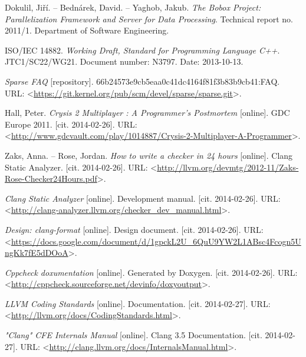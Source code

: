 
\def\bibname{Bibliography}
\begin{thebibliography}{99}
\addcontentsline{toc}{chapter}{\bibname}


	{\sc Dokulil}, Jiří. -- {\sc Bednárek}, David. -- {\sc Yaghob}, Jakub.
	\emph{The Bobox Project: Parallelization Framework and Server for Data Processing}.
	Technical report no. 2011/1.
	Department of Software Engineering.
	
	ISO/IEC 14882.
	\emph{Working Draft, Standard for Programming Language C++}.
	JTC1/SC22/WG21.
	Document number: N3797.
	Date: 2013-10-13.
	
	\emph{Sparse FAQ} [repository].
	66b24573e9cb5eaa0c41dc4164f81f3b83b9cb41:FAQ.
	URL: <\url{https://git.kernel.org/pub/scm/devel/sparse/sparse.git}>.
	
	{\sc Hall}, Peter.
	\emph{Crysis 2 Multiplayer : A Programmer's Postmortem} [online].
	GDC Europe 2011.
	[cit. 2014-02-26].
	URL: <\url{http://www.gdcvault.com/play/1014887/Crysis-2-Multiplayer-A-Programmer}>.
	
	{\sc Zaks}, Anna. -- {\sc Rose}, Jordan.
	\emph{How to write a checker in 24 hours} [online].
	Clang Static Analyzer.
	[cit. 2014-02-26].
	URL: <\url{http://llvm.org/devmtg/2012-11/Zaks-Rose-Checker24Hours.pdf}>.
	
	\emph{Clang Static Analyzer} [online].
	Development manual.
	[cit. 2014-02-26].
	URL: <\url{http://clang-analyzer.llvm.org/checker_dev_manual.html}>.
	
	\emph{Design: clang-format} [online].
	Design document.
	[cit. 2014-02-26].
	URL: <\url{https://docs.google.com/document/d/1gpckL2U_6QuU9YW2L1ABsc4Fcogn5UngKk7fE5dDOoA}>.
	
	\emph{Cppcheck doxumentation} [online].
	Generated by Doxygen.
	[cit. 2014-02-26].
	URL: <\url{http://cppcheck.sourceforge.net/devinfo/doxyoutput}>.
	
	\emph{LLVM Coding Standards} [online].
	Documentation.
	[cit. 2014-02-27].
	URL: <\url{http://llvm.org/docs/CodingStandards.html}>.
	
	\emph{"Clang" CFE Internals Manual} [online].
	Clang 3.5 Documentation.
	[cit. 2014-02-27].
	URL: <\url{http://clang.llvm.org/docs/InternalsManual.html}>.
  
\end{thebibliography}
